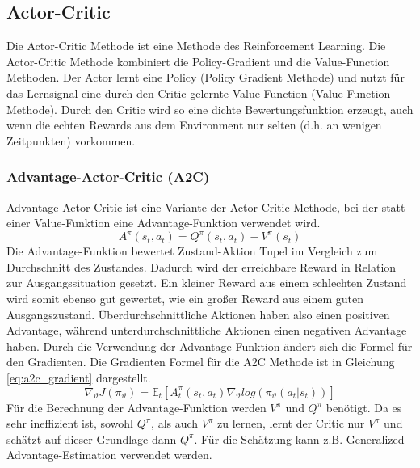\subsection{Actor-Critic}
Die Actor-Critic Methode ist eine Methode des Reinforcement Learning. Die Actor-Critic Methode kombiniert die Policy-Gradient und die Value-Function Methoden. Der Actor lernt eine Policy (Policy Gradient Methode) und nutzt für das Lernsignal eine durch den Critic gelernte Value-Function (Value-Function Methode). Durch den Critic wird so eine dichte Bewertungsfunktion erzeugt, auch wenn die echten Rewards aus dem Environment nur selten (d.h. an wenigen Zeitpunkten) vorkommen. 

\subsubsection{Advantage-Actor-Critic (A2C)}
Advantage-Actor-Critic ist eine Variante der Actor-Critic Methode, bei der statt einer Value-Funktion eine Advantage-Funktion verwendet wird.
\begin{equation}
    A^\pi(s_t,a_t) = Q^\pi(s_t,a_t) - V^\pi(s_t)
    \label{eq:advantage_function}
\end{equation}
Die Advantage-Funktion bewertet Zustand-Aktion Tupel im Vergleich zum Durchschnitt des Zustandes. Dadurch wird der erreichbare Reward in Relation zur Ausgangssituation gesetzt. Ein kleiner Reward aus einem schlechten Zustand wird somit ebenso gut gewertet, wie ein großer Reward aus einem guten Ausgangszustand. Überdurchschnittliche Aktionen haben also einen positiven Advantage, während unterdurchschnittliche Aktionen einen negativen Advantage haben.
Durch die Verwendung der Advantage-Funktion ändert sich die Formel für den Gradienten. Die Gradienten Formel für die A2C Methode ist in Gleichung \ref{eq:a2c_gradient} dargestellt.
\begin{equation}
    \nabla_\vartheta J(\pi_\vartheta) = \mathbb{E}_t\left[ A_t^\pi (s_t,a_t) \nabla_\vartheta log(\pi_\vartheta(a_t\vert s_t))\right]
    \label{eq:a2c_gradient}
\end{equation}
Für die Berechnung der Advantage-Funktion werden $V^\pi$ und $Q^\pi$ benötigt. Da es sehr ineffizient ist, sowohl $Q^\pi$, als auch $V^\pi$ zu lernen, lernt der Critic nur $V^\pi$ und schätzt auf dieser Grundlage dann $Q^\pi$. Für die Schätzung kann z.B. Generalized-Advantage-Estimation verwendet werden.


